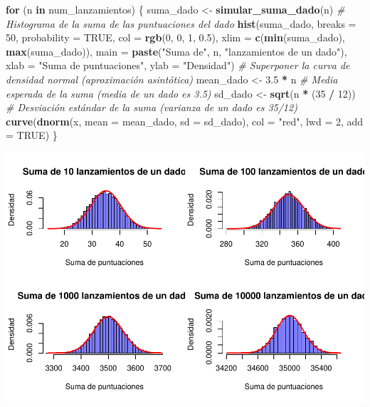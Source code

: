 \documentclass[
]{article}
\newenvironment{Shaded}{\begin{snugshade}}{\end{snugshade}}
\newcommand{\AttributeTok}[1]{\textcolor[rgb]{0.13,0.29,0.53}{#1}}
\newcommand{\CommentTok}[1]{\textcolor[rgb]{0.56,0.35,0.01}{\textit{#1}}}
\newcommand{\ConstantTok}[1]{\textcolor[rgb]{0.56,0.35,0.01}{#1}}
\newcommand{\ControlFlowTok}[1]{\textcolor[rgb]{0.13,0.29,0.53}{\textbf{#1}}}
\newcommand{\DecValTok}[1]{\textcolor[rgb]{0.00,0.00,0.81}{#1}}
\newcommand{\FloatTok}[1]{\textcolor[rgb]{0.00,0.00,0.81}{#1}}
\newcommand{\FunctionTok}[1]{\textcolor[rgb]{0.13,0.29,0.53}{\textbf{#1}}}
\newcommand{\NormalTok}[1]{#1}
\newcommand{\OtherTok}[1]{\textcolor[rgb]{0.56,0.35,0.01}{#1}}
\newcommand{\SpecialCharTok}[1]{\textcolor[rgb]{0.81,0.36,0.00}{\textbf{#1}}}
\newcommand{\StringTok}[1]{\textcolor[rgb]{0.31,0.60,0.02}{#1}}
\begin{document}
\begin{Shaded}
\begin{Highlighting}[]
\ControlFlowTok{for}\NormalTok{ (n }\ControlFlowTok{in}\NormalTok{ num\_lanzamientos) \{}
\NormalTok{  suma\_dado }\OtherTok{\textless{}{-}} \FunctionTok{simular\_suma\_dado}\NormalTok{(n)}
  \CommentTok{\# Histograma de la suma de las puntuaciones del dado}
  \FunctionTok{hist}\NormalTok{(suma\_dado, }\AttributeTok{breaks =} \DecValTok{50}\NormalTok{, }\AttributeTok{probability =} \ConstantTok{TRUE}\NormalTok{, }
       \AttributeTok{col =} \FunctionTok{rgb}\NormalTok{(}\DecValTok{0}\NormalTok{, }\DecValTok{0}\NormalTok{, }\DecValTok{1}\NormalTok{, }\FloatTok{0.5}\NormalTok{), }\AttributeTok{xlim =} \FunctionTok{c}\NormalTok{(}\FunctionTok{min}\NormalTok{(suma\_dado), }\FunctionTok{max}\NormalTok{(suma\_dado)), }
       \AttributeTok{main =} \FunctionTok{paste}\NormalTok{(}\StringTok{"Suma de"}\NormalTok{, n, }\StringTok{"lanzamientos de un dado"}\NormalTok{), }
       \AttributeTok{xlab =} \StringTok{"Suma de puntuaciones"}\NormalTok{, }\AttributeTok{ylab =} \StringTok{"Densidad"}\NormalTok{)}
  \CommentTok{\# Superponer la curva de densidad normal (aproximación asintótica)}
\NormalTok{  mean\_dado }\OtherTok{\textless{}{-}} \FloatTok{3.5} \SpecialCharTok{*}\NormalTok{ n  }\CommentTok{\# Media esperada de la suma (media de un dado es 3.5)}
\NormalTok{  sd\_dado }\OtherTok{\textless{}{-}} \FunctionTok{sqrt}\NormalTok{(n }\SpecialCharTok{*}\NormalTok{ (}\DecValTok{35} \SpecialCharTok{/} \DecValTok{12}\NormalTok{))  }\CommentTok{\# Desviación estándar de la suma (varianza de un dado es 35/12)}
  \FunctionTok{curve}\NormalTok{(}\FunctionTok{dnorm}\NormalTok{(x, }\AttributeTok{mean =}\NormalTok{ mean\_dado, }\AttributeTok{sd =}\NormalTok{ sd\_dado), }
        \AttributeTok{col =} \StringTok{"red"}\NormalTok{, }\AttributeTok{lwd =} \DecValTok{2}\NormalTok{, }\AttributeTok{add =} \ConstantTok{TRUE}\NormalTok{)}
\NormalTok{\}}
\end{Highlighting}
\end{Shaded}

\includegraphics{_main_files/figure-latex/unnamed-chunk-15-1.pdf}
\end{document}
